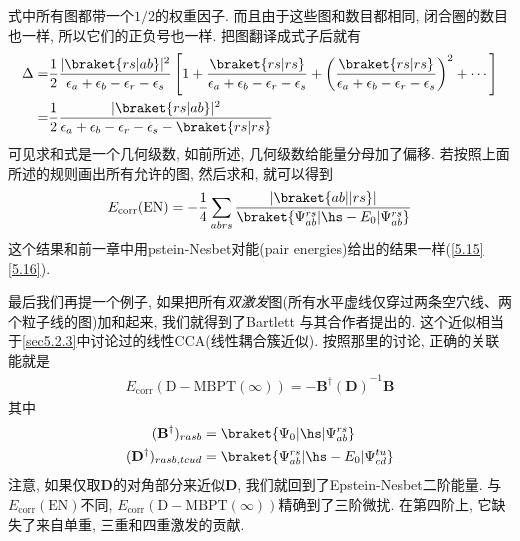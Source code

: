 式中所有图都带一个$1/2$的权重因子. 
而且由于这些图和数目都相同, 
闭合圈的数目也一样, 
所以它们的正负号也一样. 
把图翻译成式子后就有
\begin{align*}
\Delta =& \frac{1}{2}\frac{|\braket{rs|ab}|^2}{\epsilon_{a}+\epsilon_{b}-\epsilon_{r}-\epsilon_{s}}\left[ 1+ \frac{\braket{rs|rs}}{\epsilon_{a}+\epsilon_{b}-\epsilon_{r}-\epsilon_{s}}+ \left( \frac{\braket{rs|rs}}{\epsilon_{a}+\epsilon_{b}-\epsilon_{r}-\epsilon_{s}}\right)^2 + \cdots \right]\\
=& \frac{1}{2}\frac{|\braket{rs|ab}|^2}{\epsilon_{a}+\epsilon_{b}-\epsilon_{r}-\epsilon_{s} - \braket{rs|rs}}
\end{align*}
可见求和式是一个几何级数, 
如前所述, 
几何级数给能量分母加了偏移. 
若按照上面所述的规则画出所有允许的图, 
然后求和, 
就可以得到
\begin{align}
E_\mathrm{corr}(\mathrm{EN}) = -\frac{1}{4}\sum_{abrs}\frac{|\braket{ab||rs}|}{\braket{\Psi_{ab}^{rs}|\hs-E_0|\Psi_{ab}^{rs}}}
\end{align}
这个结果和前一章中用pstein-Nesbet对能(pair energies)给出的结果一样(\autoref{5.15}\autoref{5.16}).


最后我们再提一个例子, 
如果把所有\emph{双激发}图(所有水平虚线仅穿过两条空穴线、两个粒子线的图)加和起来, 
我们就得到了Bartlett
与其合作者提出的. 
这个近似相当于\autoref{sec5.2.3}中讨论过的线性CCA(线性耦合簇近似). 
按照那里的讨论, 
正确的关联能就是
\begin{align}
E_\mathrm{corr}(\mathrm{D-MBPT}(\infty)) = -\mathbf{B^\dagger(D)}^{-1}\mathbf{B}
\end{align}
其中
\begin{subequations}
\begin{align}
(\mathbf{B}^\dagger)_{rasb} &= \braket{\Psi_0|\hs|\Psi_{ab}^{rs}}\\
(\mathbf{D}^\dagger)_{rasb,tcud} &= \braket{\Psi_{ab}^{rs}|\hs-E_0|\Psi_{cd}^{tu}}
\end{align}
\end{subequations}
注意, 
如果仅取$\mathbf{D}$的对角部分来近似$\mathbf{D}$, 
我们就回到了Epstein-Nesbet二阶能量. 
与$E_\mathrm{corr}(\mathrm{EN})$不同, 
$E_\mathrm{corr}(\mathrm{D-MBPT}(\infty))$精确到了三阶微扰. 
在第四阶上, 
它缺失了来自单重, 
三重和四重激发的贡献.

